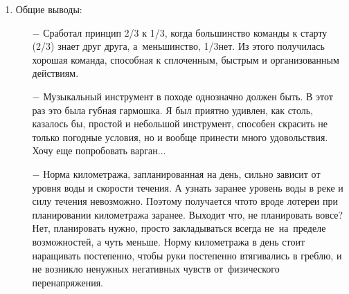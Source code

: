 \begin{enumerate}
\begin{enumerate}
		\item[$-$] Газовая плитка. Неоднозначная вещь, взятая с собой Димой. Один раз на ней мы приготовили плов и~несколько раз вскипятили воды на чай. Имеет право на жизнь, места и веса много не занимает. Но тащить их несколько на 6 человек бессмысленно при таком мероприятии, как наше. Вероятнее всего, будет правильно сказать, что это такой своеобразный запасной вариант.
		\item[$-$] Панама оправдала себя лучше, чем кепки. Нос и~уши не обгорают на ярком солнце, будучи прикрыты полями панамы. Харизматичная фетровая шляпа С.Ю. была вне конкуренции.
		\item[$-$] Сплавляться при чувствительной и ещё незагорелой коже лучше в х/б с длинным рукавом. У меня на такой случай есть то-о-оненький камуфляжный костюм, но пойдет и обычная х/б рубашка. Стало жарко\mdash закатал рукава. Чувствуешь, что поджаривает солнышко\mdash раскатал и намочил водой. 
		\item[$-$] Более плотная курточка с капюшоном а\sdash ля штормовка\mdash однозначно должна быть. Только, не синтетическая. Вообще, судьба синтетических тканей в походе печальна. Обычно они заканчивают в костре. Исключение составляет разве что флис.
		\item[$-$] Сапоги. В этот раз в них был Ваня и это простительно\mdash они ехали у него на байдарке и никому не мешали. Остальные были либо в~шлепанцах, либо босиком, либо в химзащите. Моё предпочтение при прохладной воде, непогоде и~просто нежелании мочить ноги\mdash за химзащитой по~причине легкости, компактности и дешевизны.
	\end{enumerate}
\item Общие выводы:
	\begin{enumerate}
		\item[$-$] Сработал принцип 2/3 к 1/3, когда большинство команды к старту (2/3) знает друг друга, а~меньшинство, 1/3\mdash нет. Из этого получилась хорошая команда, способная к сплоченным, быстрым и организованным действиям.
		\item[$-$] Музыкальный инструмент в походе однозначно должен быть. В этот раз это была губная гармошка. Я был приятно удивлен, как столь, казалось бы, простой и небольшой инструмент, способен скрасить не только погодные условия, но и вообще принести много удовольствия. Хочу еще попробовать варган$\ldots$
		\item[$-$] Норма километража, запланированная на день, сильно зависит от уровня воды и скорости течения. А узнать заранее уровень воды в реке и силу течения невозможно. Поэтому получается что\sdash то вроде лотереи при планировании километража заранее. Выходит что, не планировать вовсе? Нет, планировать нужно, просто закладываться всегда не~на~пределе возможностей, а чуть меньше. Норму километража в день стоит наращивать постепенно, чтобы руки постепенно втягивались в греблю, и не возникло ненужных негативных чувств от~физического перенапряжения.

\end{enumerate}
\end{enumerate}
